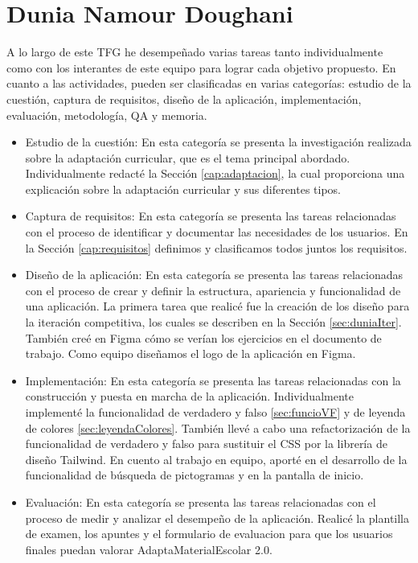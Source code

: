 \section{Dunia Namour Doughani}
A lo largo de este TFG he desempeñado varias tareas tanto individualmente como con los interantes de este equipo para lograr cada objetivo propuesto. En cuanto a las actividades, pueden ser clasificadas en varias categorías: estudio de la cuestión, captura de requisitos, diseño de la aplicación, implementación, evaluación, metodología, QA y memoria.
\begin{itemize}
    \item  Estudio de la cuestión: En esta categoría se presenta la investigación realizada sobre la adaptación curricular, que es el tema principal abordado. Individualmente redacté la Sección \ref{cap:adaptacion}, la cual proporciona una explicación sobre la adaptación curricular y sus diferentes tipos.
    \item Captura de requisitos: En esta categoría se presenta las tareas relacionadas con el proceso de identificar y documentar las necesidades de los usuarios. En la Sección \ref{cap:requisitos} definimos y clasificamos todos juntos los requisitos.
    \item Diseño de la aplicación: En esta categoría se presenta las tareas relacionadas con el proceso de crear y definir la estructura, apariencia y funcionalidad de una aplicación. La primera tarea que realicé fue la creación de los diseño para la iteración competitiva, los cuales se describen en la Sección \ref{sec:duniaIter}. También creé en Figma cómo se verían los ejercicios en el documento de trabajo. Como equipo diseñamos el logo de la aplicación en Figma.
    \item Implementación: En esta categoría se presenta las tareas relacionadas con la construcción y puesta en marcha de la aplicación. Individualmente implementé la funcionalidad de verdadero y falso \ref{sec:funcioVF} y de leyenda de colores \ref{sec:leyendaColores}. También llevé a cabo una refactorización de la funcionalidad de verdadero y falso para sustituir el CSS por la librería de diseño Tailwind. En cuento al trabajo en equipo, aporté en el desarrollo de la funcionalidad de búsqueda de pictogramas y en la pantalla de inicio.
    \item Evaluación: En esta categoría se presenta las tareas relacionadas con el proceso de medir y analizar el desempeño de la aplicación. Realicé la plantilla de examen, los apuntes y el formulario de evaluacion para que los usuarios finales puedan valorar AdaptaMaterialEscolar 2.0.

\end{itemize}
